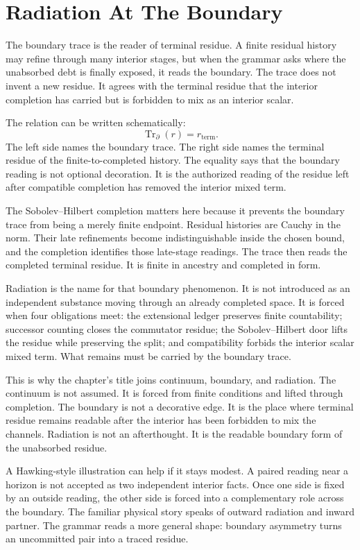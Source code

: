 \section{Radiation At The Boundary}

The boundary trace is the reader of terminal residue. A finite residual
history may refine through many interior stages, but when the grammar asks
where the unabsorbed debt is finally exposed, it reads the boundary. The
trace does not invent a new residue. It agrees with the terminal residue that
the interior completion has carried but is forbidden to mix as an interior
scalar.

The relation can be written schematically:
\[
  \operatorname{Tr}_{\partial}(r) = r_{\mathrm{term}} .
\]
The left side names the boundary trace. The right side names the terminal
residue of the finite-to-completed history. The equality says that the
boundary reading is not optional decoration. It is the authorized reading of
the residue left after compatible completion has removed the interior mixed
term.

The Sobolev--Hilbert completion matters here because it prevents the boundary
trace from being a merely finite endpoint. Residual histories are Cauchy in
the norm. Their late refinements become indistinguishable inside the chosen
bound, and the completion identifies those late-stage readings. The trace
then reads the completed terminal residue. It is finite in ancestry and
completed in form.

Radiation is the name for that boundary phenomenon. It is not introduced as
an independent substance moving through an already completed space. It is
forced when four obligations meet: the extensional ledger preserves finite
countability; successor counting closes the commutator residue; the
Sobolev--Hilbert door lifts the residue while preserving the split; and
compatibility forbids the interior scalar mixed term. What remains must be
carried by the boundary trace.

This is why the chapter's title joins continuum, boundary, and radiation.
The continuum is not assumed. It is forced from finite conditions and lifted
through completion. The boundary is not a decorative edge. It is the place
where terminal residue remains readable after the interior has been
forbidden to mix the channels. Radiation is not an afterthought. It is the
readable boundary form of the unabsorbed residue.

A Hawking-style illustration can help if it stays modest. A paired reading
near a horizon is not accepted as two independent interior facts. Once one
side is fixed by an outside reading, the other side is forced into a
complementary role across the boundary. The familiar physical story speaks
of outward radiation and inward partner. The grammar reads a more general
shape: boundary asymmetry turns an uncommitted pair into a traced residue.

